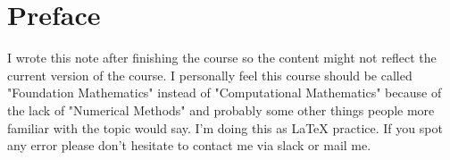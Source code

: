 \chapter{Preface}
I wrote this note after finishing the course so the content might not reflect the current version of the course. I personally feel this course should be called "Foundation Mathematics" instead of "Computational Mathematics" because of the lack of "Numerical Methods" and probably some other things people more familiar with the topic would say. I'm doing this as LaTeX practice. If you spot any error please don't hesitate to contact me via slack or mail me.